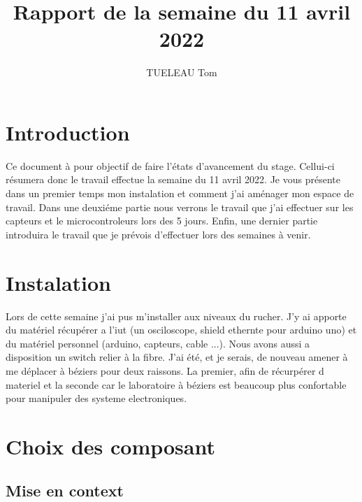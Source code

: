 \documentclass[5pt]{article}
\title{Rapport de la semaine du 11 avril 2022}
\author{TUELEAU Tom}
\begin{document}
\maketitle
\section{Introduction}
Ce document à pour objectif de faire l'états d'avancement du stage. Cellui-ci résumera donc le travail effectue la semaine du 11 avril 2022.
Je vous présente dans un premier temps mon instalation et comment j'ai aménager mon espace de travail. Dans une deuxiéme partie
nous verrons le travail que j'ai effectuer sur les capteurs et le microcontroleurs lors des 5 jours. Enfin, une dernier partie introduira le travail 
que je prévois d'effectuer lors des semaines à venir. 

\section{Instalation}
Lors de cette semaine j'ai pus m'installer aux niveaux du rucher. J'y ai apporte du matériel récupérer a l'iut (un osciloscope, shield ethernte pour
arduino uno) et du matériel personnel (arduino, capteurs, cable ...). Nous avons aussi a disposition un switch relier à la fibre. J'ai été, et je serais,
de nouveau amener à me déplacer à béziers pour deux raissons. La premier, afin de récurpérer d materiel et la seconde car le laboratoire à béziers est beaucoup
plus confortable pour manipuler des systeme electroniques.
\section{Choix des composant}

\subsection{Mise en context}
\end{document}
